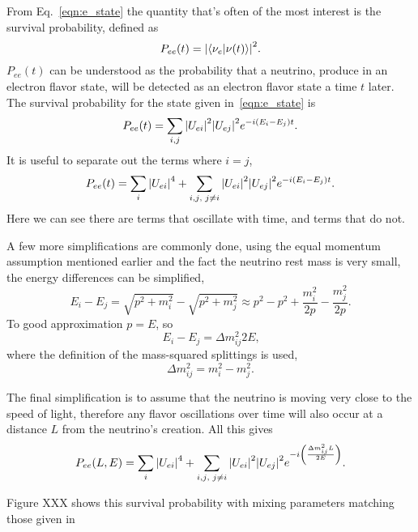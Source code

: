 From Eq.~\eqref{eqn:e_state} the quantity that's often of the most interest
is the survival probability, defined as
\begin{equation}
    P_{ee}(t) = \abs{\braket{\nu_{e}}{\nu(t)}}^{2}\text{.}
\end{equation}
$P_{ee}(t)$ can be understood as the probability that a neutrino, produce in
an electron flavor state, will be detected as an electron flavor state a time
$t$ later.
The survival probability for the state given in~\eqref{eqn:e_state} is
\begin{equation}
    P_{ee}(t) = \sum_{i,j}\abs{U_{ei}}^2\abs{U_{ej}}^2e^{-i(E_{i} - E_{j})t}\text{.}
\end{equation}
It is useful to separate out the terms where $i=j$,
\begin{equation}
    P_{ee}(t) = \sum_{i}\abs{U_{ei}}^4 + \sum_{i,j\text{, }j \ne i}
    \abs{U_{ei}}^2\abs{U_{ej}}^2e^{-i(E_{i} - E_{j})t}\text{.}
\end{equation}
Here we can see there are terms that oscillate with time, and terms that do
not.

A few more simplifications are commonly done, using the equal momentum
assumption mentioned earlier and the fact the neutrino rest mass is
very small, the energy differences can be simplified,
\begin{equation}
    E_{i} - E_{j} = \sqrt{p^{2} + m_{i}^{2}} - \sqrt{p^{2} + m_{j}^{2}} \approx
    p^{2} - p^{2} + \frac{m_{i}^2}{2p} - \frac{m_{j}^2}{2p}\text{.}
\end{equation}
To good approximation $p=E$, so
\begin{equation}
    E_{i} - E_{j} = {\Delta m^{2}_{ij}}{2E}\text{,}
\end{equation}
where the definition of the mass-squared splittings is used,
\begin{equation}
    \Delta m^{2}_{ij} = m^{2}_{i} - m^{2}_{j}\text{.}
\end{equation}

The final simplification is to assume that the neutrino is moving very close
to the speed of light, therefore any flavor oscillations over time will also
occur at a distance $L$ from the neutrino's creation.
All this gives
\begin{equation}
    P_{ee}(L,E) = \sum_{i}\abs{U_{ei}}^4 +
    \sum_{i,j\text{, }j \ne i}
    \abs{U_{ei}}^2\abs{U_{ej}}^2e^{-i\left(\frac{\Delta m^{2}_{ij}L}{2E}\right)}\text{.}
\end{equation}


Figure XXX shows this survival probability with mixing parameters matching those
given in~\cite{PDG2016}

